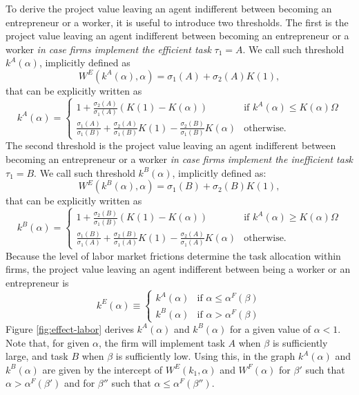 \documentclass[12pt,american]{paper}
\theoremstyle{remark}
\begin{document}
To derive the project value leaving an agent indifferent between becoming an entrepreneur or a worker, it is useful to introduce two thresholds. The first is the project value leaving an agent indifferent between becoming an entrepreneur or a worker \textit{in case firms implement the efficient task} $\tau_1=A$. We call such threshold $k^A(\alpha)$, implicitly defined as
\[
 W^E(k^A(\alpha),\alpha) = \sigma_1(A) + \sigma_2(A) K(1),
\]
that can be explicitly written as
\[
k^A(\alpha) = \begin{cases}
1+\frac{\sigma_2(A)}{\sigma_1(A)} (K(1)-K(\alpha)) &\mbox{if } k^A(\alpha) \leq K(\alpha) \Omega \\
\frac{\sigma_1(A)}{\sigma_1(B)}+\frac{\sigma_2(A)}{\sigma_1(B)} K(1)-\frac{\sigma_2(B)}{\sigma_1(B)} K(\alpha)  &\mbox{otherwise. } 
\end{cases}
\]
The second threshold is the project value leaving an agent indifferent between becoming an entrepreneur or a worker \textit{in case firms implement the inefficient task} $\tau_1=B$. We call such threshold $k^B(\alpha)$, implicitly defined as:
\[
 W^E(k^B(\alpha),\alpha) = \sigma_1(B) + \sigma_2(B) K(1),
\]
that can be explicitly written as
\[
k^B(\alpha)= \begin{cases}
1+\frac{\sigma_2(B)}{\sigma_1(B)} (K(1)-K(\alpha)) &\mbox{if } k^A(\alpha) \geq K(\alpha) \Omega \\
\frac{\sigma_1(B)}{\sigma_1(A)}+\frac{\sigma_2(B)}{\sigma_1(A)} K(1)-\frac{\sigma_2(A)}{\sigma_1(A)} K(\alpha)  &\mbox{otherwise. } 
\end{cases}
\]
Because the level of labor market frictions determine the task allocation within firms, the project value leaving an agent indifferent between being a worker or an entrepreneur is
\[
k^E (\alpha)  \equiv 
\begin{cases}
k^A(\alpha) &\mbox{if } \alpha \leq \alpha^F(\beta) \\
k^B(\alpha)  &\mbox{if } \alpha > \alpha^F(\beta)
\end{cases}
\]
Figure \ref{fig:effect-labor} derives $k^A (\alpha)$ and $k^B (\alpha)$ for a given value of $\alpha<1$. Note that, for given $\alpha$, the firm will implement task $A$ when $\beta$ is sufficiently large, and task $B$ when $\beta$ is sufficiently low. Using this, in the graph $k^A (\alpha)$ and $k^B (\alpha)$ are given by the intercept of $W^E(k_1,\alpha)$ and $W^F(\alpha)$ for $\beta'$ such that $\alpha > \alpha^F(\beta')$ and for $\beta''$ such that $\alpha \leq \alpha^F(\beta'')$.
\end{document}
